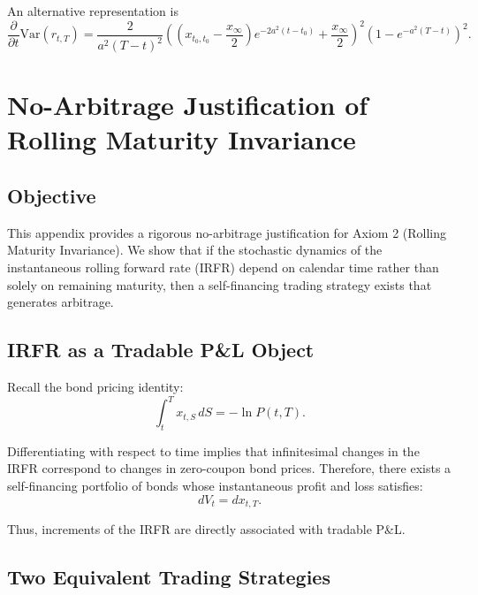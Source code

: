 \documentclass[12pt]{article}
\theoremstyle{statementstyle}
\begin{document}
\begin{appendices}
An alternative representation is
\begin{equation}
\frac{\partial}{\partial t}\mathrm{Var}(r_{t,T})
=
\frac{2}{a^2(T-t)^2}
\left(
\left(x_{t_0,t_0}-\frac{x_\infty}{2}\right)e^{-2a^2(t-t_0)}
+\frac{x_\infty}{2}
\right)^2
\left(1-e^{-a^2(T-t)}\right)^2.
\tag{C.1.7}\label{eq:C17}
\end{equation}





\section{No-Arbitrage Justification of Rolling Maturity Invariance}
\label{Appedix D}

\subsection{Objective}
\label{D.1}

This appendix provides a rigorous no-arbitrage justification for Axiom 2 (Rolling Maturity Invariance). We show that if the stochastic dynamics of the instantaneous rolling forward rate (IRFR) depend on calendar time rather than solely on remaining maturity, then a self-financing trading strategy exists that generates arbitrage.

\subsection{IRFR as a Tradable P\&L Object}
\label{D.2}

Recall the bond pricing identity:
\[
\int_t^T x_{t,S} \, dS = -\ln P(t,T).
\]

Differentiating with respect to time implies that infinitesimal changes in the IRFR correspond to changes in zero-coupon bond prices. Therefore, there exists a self-financing portfolio of bonds whose instantaneous profit and loss satisfies:
\[
dV_t = dx_{t,T}.
\]

Thus, increments of the IRFR are directly associated with tradable P\&L.

\subsection{Two Equivalent Trading Strategies}
\label{D.3}


\end{appendices}
\end{document}
